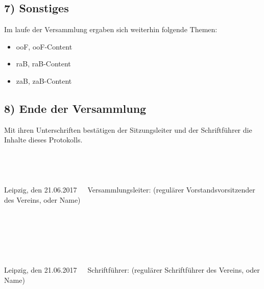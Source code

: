 \documentclass[10pt,a4paper]{scrartcl}
\newcommand{\eventdate}{21.06.2017}
\newcommand{\versammlungsleiter}{(regul{\"a}rer Vorstandsvorsitzender des Vereins, oder Name)}
\newcommand{\schriftfuehrer}{(regul{\"a}rer Schriftf{\"u}hrer des Vereins, oder Name)}
\begin{document}
\subsection*{7) Sonstiges}
    Im laufe der Versammlung ergaben sich weiterhin folgende Themen:
	\begin{itemize}
        \item ooF, ooF-Content
        \item raB, raB-Content
        \item zaB, zaB-Content
    \end{itemize}
	
\subsection*{8) Ende der Versammlung}
    Mit ihren Unterschriften best{\"a}tigen der Sitzungsleiter und der Schriftf{\"u}hrer die Inhalte dieses Protokolls.
\\
\\
\\
\\
\\
Leipzig, den \eventdate \ \ \ Versammlungsleiter: \versammlungsleiter\\
\\
\\
\\
\\
\\
\\
Leipzig, den \eventdate \ \ \ Schriftf{\"u}hrer: \schriftfuehrer
\end{document}

